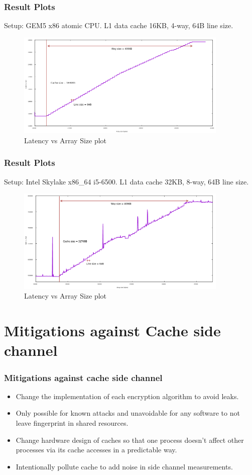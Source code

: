 \documentclass[10pt]{beamer}
\begin{document}
\begin{frame}
\frametitle{Result Plots}
Setup: GEM5 x86 atomic CPU. L1 data cache 16KB, 4-way, 64B line size.
\begin{figure}
\includegraphics[width=0.9\textwidth]{reverse_eng_16kb}
\caption{Latency vs Array Size plot}
\end{figure}
\end{frame}

\begin{frame}
\frametitle{Result Plots}
Setup: Intel Skylake x86\_64 i5-6500. L1 data cache 32KB, 8-way, 64B line size.
\begin{figure}
\includegraphics[width=0.9\textwidth]{reverse_eng_32kb}
\caption{Latency vs Array Size plot}
\end{figure}
\end{frame}

\section{Mitigations against Cache side channel}

\begin{frame}
\frametitle{Mitigations against cache side channel}
\begin{itemize}
    \item Change the implementation of each encryption algorithm to avoid leaks.
    \item Only possible for known attacks and unavoidable for any software to not leave fingerprint in shared resources.
    \item Change hardware design of caches so that one process doesn’t affect other processes via its cache accesses in a predictable way.
    \item Intentionally pollute cache to add noise in side channel measurements.
\end{itemize}
\end{frame}
\end{document}
